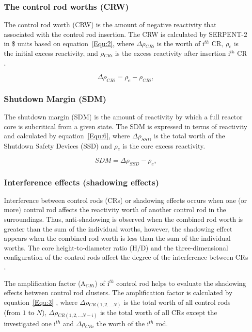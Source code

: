 \subsubsection{The control rod worths (CRW)}

The control rod worth (CRW) is the amount of negative reactivity that associated with the control rod insertion. The CRW is calculated by SERPENT-2 in \$ units based on equation~\ref{Equ:2}, where $\Delta\rho$$_{CRi}$ is the worth of i$^{th}$ CR, $\rho$$_e$ is the initial excess reactivity, and $\rho$$_{CRi}$ is the excess reactivity after insertion i$^{th}$ CR \cite{vcerba2017optimization}.

\begin{equation}
\label{Equ:2}
{{\Delta}{\rho}_{CRi}}={{\rho}_{e}}-{{\rho}_{CRi}},
\end{equation}

\subsubsection{Shutdown Margin (SDM)}

The shutdown margin (SDM) is the amount of reactivity by which a full reactor core is subcritical from a given state. The SDM is expressed in terms of reactivity and calculated by equation~\ref{Equ:6}, where $\Delta\rho_{SSD}$ is the total worth of the Shutdown Safety Devices (SSD) and $\rho$$_e$ is the core excess reactivity.

\begin{equation}
\label{Equ:6}
{SDM}={{\Delta}{\rho}_{SSD}}-{{\rho}_{e}},
\end{equation}

\subsubsection{Interference effects (shadowing effects)}

Interference between control rods (CRs) or shadowing effects occurs when one (or more) control rod affects the reactivity worth of another control rod in the surroundings. Thus, anti-shadowing is observed when the combined rod worth is greater than the sum of the individual worths, however, the shadowing effect appears when the combined rod worth is less than the sum of the individual worths.
The core height-to-diameter ratio (H/D) and the three-dimensional configuration of the control rods affect the degree of the interference between CRs \cite{girardin2007control}. 

The amplification factor (A$_{CRi}$) of i$^{th}$ control rod helps to evaluate the shadowing effects between control rod clusters. The amplification factor is calculated by equation~\ref{Equ:3} \cite{girardin2007control,vcerba2017optimization}, where $\Delta\rho$$_{CR(1,2,\ldots N)}$ is the total worth of all control rods (from $1$ to $N$), $\Delta\rho$$_{CR(1,2,\ldots N-i)}$ is the total worth of all CRs except the investigated one i$^{th}$ and $\Delta\rho$$_{CRi}$ the worth of the i$^{th}$ rod.

